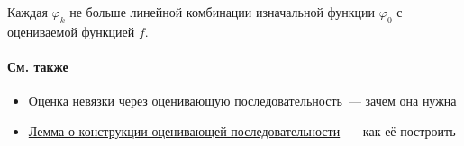 

\begin{remark}
  Каждая $\varphi_k$ не больше линейной комбинации изначальной функции $\varphi_0$ с оцениваемой функцией $f$.
\end{remark}

\paragraph*{См. также}
\begin{itemize}
  \item \hyperref[note:D21EBF43-7558-45EE-8198-60958E391E03]{Оценка невязки через оценивающую последовательность}~--- зачем она нужна
  \item \hyperref[note:C67AAFD8-D294-480B-B58E-C284BFF76D50]{Лемма о конструкции оценивающей последовательности}~--- как её построить
\end{itemize}
